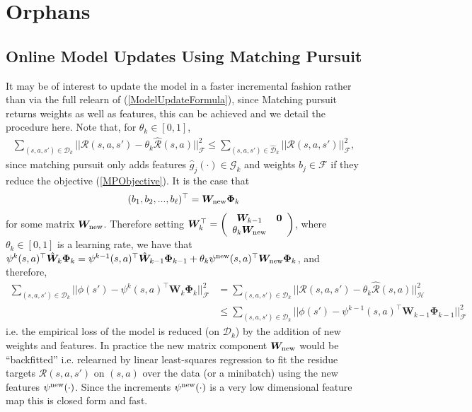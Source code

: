 \documentclass[letterpaper]{article}
\newcommand{\cD}{{\mathcal D}}
\newcommand{\cH}{{\mathcal H}}
\newcommand{\cF}{{\mathcal F}}
\newcommand{\cR}{{\mathcal R}}
\newcommand{\cG}{{\mathcal G}}
\newcommand{\bW}{{\bm W}}
\newcommand{\bPhi}{{\bm \Phi}}
\newcommand{\nn}{\nonumber}
\newcommand{\bzero}{{\bm 0}}
\begin{document}
\section{Orphans}


\subsection{Online Model Updates Using  Matching Pursuit} \label{OnlineModelUpdate}

It may be of interest to update the model in a faster incremental fashion rather than via the full relearn of (\ref{ModelUpdateFormula}), since Matching pursuit returns weights as well as features, this can be achieved and we detail the procedure here. Note that, for $\theta_k\in[0,1]$,
\begin{align}
\sum_{(s,a,s')\in\cD_k} || \cR(s,a,s') - \theta_k \hat\cR(s,a) ||^2_{\cF} \le  \sum_{(s,a,s')\in\hat\cD_k} || \cR(s,a,s') ||^2_{\cF}, \nn
\end{align}
since matching pursuit only adds features $\hat g_j(\cdot)\in\cG_k$ and weights $b_j\in\cF$ if they reduce the objective (\ref{MPObjective}). It is the case that
\begin{align}
(b_1, b_2,...,b_\ell)^\top = \bW_{\rm new} \bPhi_{k}
\end{align}
for some matrix $\bW_{\rm new}$. Therefore setting $\bW^\top_k =  \left( \begin{array}{cc}
 \bW_{k-1} &  \bzero  \\
\theta_k \bW_{\rm new} \end{array} \right)$,  where $\theta_k\in[0,1]$ is a learning rate, we have that
$\psi^k(s,a)^\top\hat\bW_k \bPhi_k =  \psi^{k-1}(s,a)^\top\hat\bW_{k-1}\bPhi_{k-1} + \theta_k \psi^{\rm new}(s,a)^\top \bW_{\rm new}\bPhi_k$, and therefore,
\begin{align}
\sum_{(s,a,s')\in\cD_k} || \phi(s') -\psi^k(s,a)^\top\bW_k \bPhi_k  ||^2_{\cF} &=\sum_{(s,a,s')\in\cD_k} || \cR(s,a,s') - \theta_k \hat\cR(s,a) ||^2_{\cH}\nn\\
&\le \sum_{(s,a,s')\in\cD_k} || \phi(s') -  \psi^{k-1}(s,a)^\top\bW_{k-1} \bPhi_{k-1}||^2_{\cF} \nn
\end{align}
i.e. the empirical loss of the model is reduced (on $\cD_k$) by the addition of new weights and features. In practice the new matrix component $\bW_{\rm new}$ would be ``backfitted'' i.e. relearned by linear least-squares regression to fit the residue targets $\cR(s,a,s')$ on $(s,a)$ over the data (or a minibatch) using the new features $\psi^{\rm new}(\cdot)$. Since the increments $\psi^{\rm new}(\cdot)$ is a very low dimensional feature map this is closed form and fast.
\end{document}
